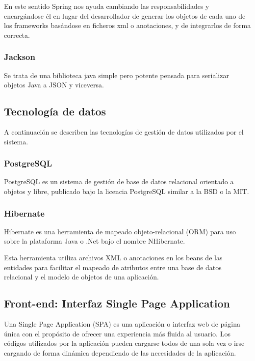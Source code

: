 En este sentido Spring nos ayuda cambiando las responsabilidades y encargándose él en lugar del desarrollador de generar los objetos de cada uno de los frameworks basándose en ficheros xml o anotaciones, y de integrarlos de forma correcta.

\subsubsection{Jackson}

Se trata de una biblioteca java simple pero potente pensada para serializar objetos Java a JSON y viceversa.

\subsection{Tecnología de datos}

A continuación se describen las tecnologías de gestión de datos utilizados por el sistema.

\subsubsection{PostgreSQL}
PostgreSQL es un sistema de gestión de base de datos relacional orientado a objetos y libre, publicado bajo la licencia PostgreSQL similar a la BSD o la MIT.

\subsubsection{Hibernate}

Hibernate es una herramienta de mapeado objeto-relacional (ORM) para uso sobre la plataforma Java o .Net bajo el nombre NHibernate.

Esta herramienta utiliza archivos XML o anotaciones en los beans de las entidades para facilitar el mapeado de atributos entre una base de datos relacional y el modelo de objetos de una aplicación.

\subsection{Front-end: Interfaz Single Page Application}

Una Single Page Application (SPA) es una aplicación o interfaz web de página única con el propósito de ofrecer una experiencia más fluida al usuario. Los códigos utilizados por la aplicación pueden cargarse todos de una sola vez o irse cargando de forma dinámica dependiendo de las necesidades de la aplicación.

